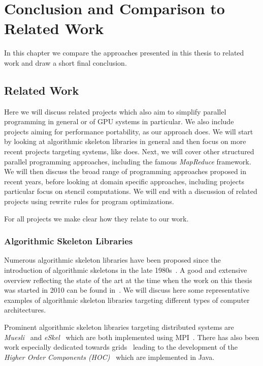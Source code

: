 
\chapter{Conclusion and Comparison to Related Work}

\label{ch:eighth} %

In this chapter we compare the approaches presented in this thesis to related work and draw a short final conclusion.

\section{Related Work}
Here we will discuss related projects which also aim to simplify parallel programming in general or of GPU systems in particular.
We also include projects aiming for performance portability, as our approach does.
We will start by looking at algorithmic skeleton libraries in general and then focus on more recent projects targeting \GPU systems, like \SkelCL does.
Next, we will cover other structured parallel programming approaches, including the famous \emph{MapReduce} framework.
We will then discuss the broad range of \GPU programming approaches proposed in recent years, before looking at domain specific approaches, including projects particular focus on stencil computations.
We will end with a discussion of related projects using rewrite rules for program optimizations.

For all projects we make clear how they relate to our work.


\subsection{Algorithmic Skeleton Libraries}
Numerous algorithmic skeleton libraries have been proposed since the introduction of algorithmic skeletons in the late 1980s~\cite{Cole1991}.
A good and extensive overview reflecting the state of the art at the time when the work on this thesis was started in 2010 can be found in~\cite{Gonzalez-VelezL10}.
We will discuss here some representative examples of algorithmic skeleton libraries targeting different types of computer architectures.

Prominent algorithmic skeleton libraries targeting distributed systems are \emph{Muesli}~\cite{Kuchen02} and \emph{eSkel}~\cite{Cole04} which are both implemented using MPI~\cite{MPI}.
There has also been work especially dedicated towards grids~\cite{AltG03a, Alt2007} leading to the development of the \emph{Higher Order Components (HOC)}~\cite{DunnweberG04,DuennweberG09} which are implemented in Java.

